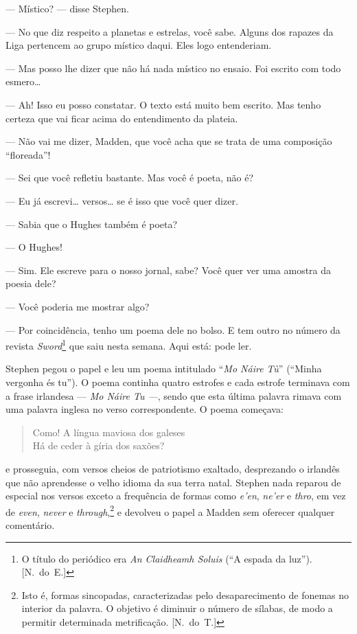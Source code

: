 --- Místico? --- disse Stephen.

--- No que diz respeito a planetas e estrelas, você sabe.  Alguns
dos rapazes da Liga pertencem ao grupo místico daqui.  Eles logo
entenderiam.

--- Mas posso lhe dizer que não há nada místico no ensaio.  Foi
escrito com todo esmero\ldots{}

--- Ah!  Isso eu posso constatar.  O texto está muito bem
escrito.  Mas tenho certeza que vai ficar acima do entendimento da
plateia.

--- Não vai me dizer, Madden, que você acha que se trata de uma
composição “floreada”!

--- Sei que você refletiu bastante.  Mas você é poeta, não é?

--- Eu já escrevi\ldots{} versos\ldots{} se é isso que você quer dizer.

--- Sabia que o Hughes também é poeta?

--- O Hughes!

--- Sim.  Ele escreve para o nosso jornal, sabe?  Você quer ver
uma amostra da poesia dele?

--- Você poderia me mostrar algo?

--- Por coincidência, tenho um poema dele no bolso.  E tem outro
no número da revista \textit{Sword}\footnote{ O título do periódico era
\textit{An Claidheamh Soluis} (“A espada da luz”). [N.~do~E.]} que saiu
nesta semana.  Aqui está: pode ler.

Stephen pegou o papel e leu um poema intitulado “\textit{Mo Náire
Tù}” (“Minha vergonha és tu”).  O poema continha quatro estrofes e cada
estrofe terminava com a frase irlandesa --- \textit{Mo Náire Tu ---},
sendo que esta última palavra rimava com uma palavra inglesa no verso
correspondente.  O poema começava:

\begin{verse}
Como!  A língua maviosa dos galeses\\
Há de ceder à gíria dos saxões?
\end{verse}

\noindent e prosseguia, com versos cheios de patriotismo exaltado, desprezando o
irlandês que não aprendesse o velho idioma da sua terra natal.  Stephen
nada reparou de especial nos versos exceto a frequência de formas como
\textit{e’en}, \textit{ne’er} e \textit{thro}, em vez de \textit{even},
\textit{never} e \textit{through},\footnote{ Isto é, formas sincopadas,
caracterizadas pelo desaparecimento de fonemas no interior da palavra.
O objetivo é diminuir o número de sílabas, de modo a permitir
determinada metrificação. [N.~do~T.]} e devolveu o papel a Madden sem
oferecer qualquer comentário.

